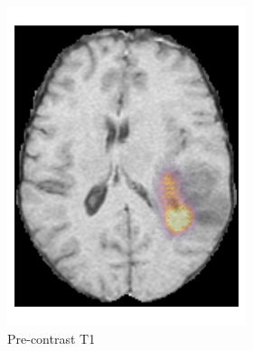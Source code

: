 \begin{figure}[htbp]
    \centering
    \begin{subfigure}[b]{\textwidth}
        \centering

        \hfill
        \begin{subfigure}[b]{0.24\textwidth}
        \includegraphics[width=\textwidth]{Figures/saliency_LGG_T1.png}
        \caption*{Pre-contrast \acrshort{T1}}
        \end{subfigure}
        \hfill
        \begin{subfigure}[b]{0.24\textwidth}

\end{subfigure}
\end{subfigure}
\end{figure}
